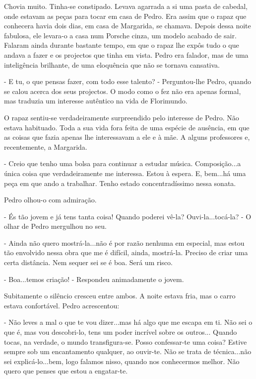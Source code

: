 Chovia muito. Tinha-se constipado. Levava agarrada a si uma pasta de
cabedal, onde estavam as peças para tocar em casa de Pedro. Era assim
que o rapaz que conhecera havia dois dias, em casa de Margarida, se
chamava. Depois dessa noite fabulosa, ele levara-o a casa num Porsche
cinza, um modelo acabado de sair. Falaram ainda durante bastante tempo,
em que o rapaz lhe expôs tudo o que andava a fazer e os projectos que
tinha em vista. Pedro era falador, mas de uma inteligência brilhante, de
uma eloquência que não se tornava cansativa.

- E tu, o que pensas fazer, com todo esse talento? - Perguntou-lhe
Pedro, quando se calou acerca dos seus projectos. O modo como o fez não
era apenas formal, mas traduzia um interesse autêntico na vida de
Florimundo.

O rapaz sentiu-se verdadeiramente surpreendido pelo interesse de Pedro.
Não estava habituado. Toda a sua vida fora feita de uma espécie de
ausência, em que as coisas que fazia apenas lhe interessavam a ele e à
mãe. A alguns professores e, recentemente, a Margarida.

- Creio que tenho uma bolsa para continuar a estudar música.
Composição...a única coisa que verdadeiramente me interessa. Estou à
espera. E, bem...há uma peça em que ando a trabalhar. Tenho estado
concentradíssimo nessa sonata.

Pedro olhou-o com admiração.

- És tão jovem e já tens tanta coisa! Quando poderei vê-la?
Ouvi-la...tocá-la? - O olhar de Pedro mergulhou no seu.

- Ainda não quero mostrá-la...não é por razão nenhuma em especial, mas
estou tão envolvido nessa obra que me é difícil, ainda, mostrá-la.
Preciso de criar uma certa distância. Nem sequer sei se é boa. Será um
risco.

- Boa...temos criação! - Respondeu animadamente o jovem.

Subitamente o silêncio cresceu entre ambos. A noite estava fria, mas o
carro estava confortável. Pedro acrescentou:

- Não leves a mal o que te vou dizer...mas há algo que me escapa em ti.
Não sei o que é, mas vou descobri-lo, tens um poder incrível sobre os
outros... Quando tocas, na verdade, o mundo transfigura-se. Posso
confessar-te uma coisa? Estive sempre sob um encantamento qualquer, ao
ouvir-te. Não se trata de técnica...não sei explicá-lo...bem, logo
falamos nisso, quando nos conhecermos melhor. Não quero que penses que
estou a engatar-te.

